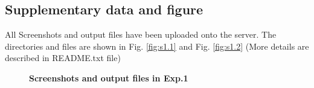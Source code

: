 \documentclass[12pt,a4paper,UTF8]{article}
\begin{document}
    \subsection{Supplementary data and figure}
    All Screenshots and output files have been uploaded onto the server. The directories and files are shown in Fig. \ref{fig:s1.1}
    and Fig. \ref{fig:s1.2} (More details are described in README.txt file)
    \begin{figure}[htbp]
        \centering
        \caption{\textbf{Screenshots and output files in Exp.1}}
    \end{figure}
\end{document}
